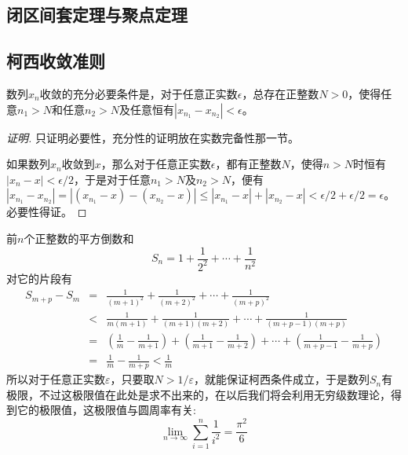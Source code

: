 \subsection{闭区间套定理与聚点定理}
\label{sec:theorem-of-closed-interval-sequence-and-accumulate-point}

\subsection{柯西收敛准则}
\label{sec:cauchy-convergence-rule}

\begin{theorem}[柯西收敛准则]
  数列$x_n$收敛的充分必要条件是，对于任意正实数$\epsilon$，总存在正整数$N>0$，使得任意$n_1>N$和任意$n_2>N$及任意恒有$|x_{n_1}-x_{n_2}| < \epsilon$。
\end{theorem}

\begin{proof}[证明]
  只证明必要性，充分性的证明放在实数完备性那一节。

  如果数列$x_n$收敛到$x$，那么对于任意正实数$\epsilon$，都有正整数$N$，使得$n>N$时恒有$|x_n-x|<\epsilon / 2$，于是对于任意$n_1>N$及$n_2>N$，便有$|x_{n_1}-x_{n_2}|=|(x_{n_1}-x)- (x_{n_2}-x)|\leqslant |x_{n_1}-x|+|x_{n_2}-x|<\epsilon / 2+\epsilon / 2 = \epsilon$。必要性得证。
\end{proof}

\begin{example}
  前$n$个正整数的平方倒数和
  \[ S_n = 1 + \frac{1}{2^2} + \cdots + \frac{1}{n^2} \]
  对它的片段有
  \begin{eqnarray*}
    S_{m+p}-S_m  & = & \frac{1}{(m+1)^2} + \frac{1}{(m+2)^2} + \cdots + \frac{1}{(m+p)^2} \\
                 & < & \frac{1}{m(m+1)} + \frac{1}{(m+1)(m+2)} + \cdots + \frac{1}{(m+p-1)(m+p)} \\
                 & = & \left( \frac{1}{m} - \frac{1}{m+1} \right) + \left( \frac{1}{m+1} - \frac{1}{m+2} \right) + \cdots + \left( \frac{1}{m+p-1} - \frac{1}{m+p} \right) \\
    & = & \frac{1}{m} - \frac{1}{m+p} < \frac{1}{m}
  \end{eqnarray*}
  所以对于任意正实数$\varepsilon$，只要取$N>1/\varepsilon$，就能保证柯西条件成立，于是数列$S_n$有极限，不过这极限值在此处是求不出来的，在以后我们将会利用无穷级数理论，得到它的极限值，这极限值与圆周率有关:
  \[ \lim_{n \to \infty} \sum_{i=1}^n \frac{1}{i^2} = \frac{\pi^2}{6} \]
\end{example}


